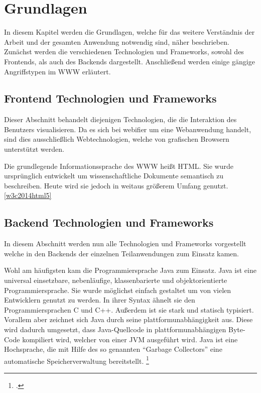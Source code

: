 \chapter{Grundlagen}

In diesem Kapitel werden die Grundlagen, welche für das weitere Verständnis der Arbeit und der gesamten Anwendung notwendig sind, näher beschrieben. Zunächst werden die verschiedenen Technologien und Frameworks, sowohl des Frontends, als auch des Backends dargestellt. Anschließend werden einige gängige Angriffstypen im \ac{WWW} erläutert.

\section{Frontend Technologien und Frameworks}

Dieser Abschnitt behandelt diejenigen Technologien, die die Interaktion des Benutzers visualisieren. Da es sich bei webifier um eine Webanwendung handelt, sind dies ausschließlich Webtechnologien, welche von grafischen Browsern unterstützt werden.

Die grundlegende Informationssprache des \ac{WWW} heißt \ac{HTML}. Sie wurde ursprünglich entwickelt um wissenschaftliche Dokumente semantisch zu beschreiben.
Heute wird sie jedoch in weitaus größerem Umfang genutzt.\ref{w3c2014html5}


\section{Backend Technologien und Frameworks}

In diesem Abschnitt werden nun alle Technologien und Frameworks vorgestellt welche in den Backends der einzelnen Teilanwendungen zum Einsatz kamen.

Wohl am häufigsten kam die Programmiersprache Java zum Einsatz. Java ist eine universal einsetzbare, nebenläufige, klassenbarierte und objektorientierte Programmiersprache. Sie wurde möglichst einfach gestaltet um von vielen Entwicklern genutzt zu werden. In ihrer Syntax ähnelt sie den Programmiersprachen C und C++. Außerdem ist sie stark und statisch typisiert. Vorallem aber zeichnet sich Java durch seine plattformunabhängigkeit aus. Diese wird dadurch umgesetzt, dass Java-Quellcode in plattformunabhängigen Byte-Code kompiliert wird, welcher von einer \ac{JVM} ausgeführt wird. Java ist eine Hochsprache, die mit Hilfe des so genannten \enquote{Garbage Collectors} eine automatische Speicherverwaltung bereitstellt. \footcite[Vgl.][1]{javaspecification}

